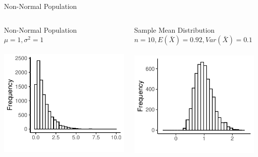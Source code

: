 \documentclass{./../div_teaching_slides}
\begin{document}
\begin{frame}{Non-Normal Population}
\centering
\begin{columns}
\begin{column}{0.475\textwidth}
\centering
Non-Normal Population \\ $\mu=1, \sigma^2 = 1$ \\~\\
\includegraphics{./../../output/clt_exp_pop.pdf}
\end{column}
\hspace{-2em}
\begin{column}{0.55\textwidth}
\centering
Sample Mean Distribution \\ $n=10, E(\bar{X})=0.92, Var(\bar{X}) = 0.1$ \\~\\
\includegraphics{./../../output/clt_exp_samp_n10.pdf}
\end{column}
\end{columns}
\end{frame}
\end{document}
